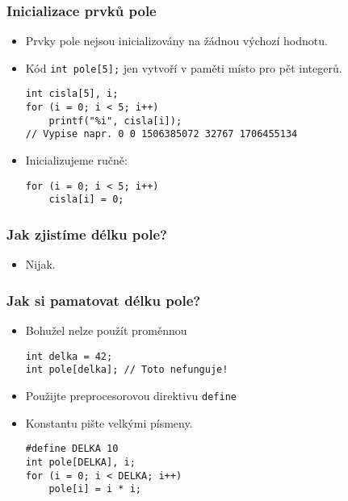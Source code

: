 \documentclass{beamer}
\newenvironment{itemizex}%
  {\large \begin{itemize}%
    \setlength{\itemsep}{8pt}%
    \setlength{\parskip}{8pt}}%
  {\end{itemize}}
\begin{document}
\begin{frame}[t,fragile]\frametitle{Inicializace prvků pole} 
  \begin{itemizex}
    \item Prvky pole nejsou inicializovány na žádnou výchozí hodnotu.
    \item Kód \texttt{int pole[5];} jen vytvoří v paměti místo pro pět integerů.
    \begin{verbatim} 
int cisla[5], i;
for (i = 0; i < 5; i++) 
    printf("%i", cisla[i]);
// Vypise napr. 0 0 1506385072 32767 1706455134
    \end{verbatim}
    \item Inicializujeme ručně:
    \begin{verbatim} 
for (i = 0; i < 5; i++) 
    cisla[i] = 0;
    \end{verbatim}
  \end{itemizex}
\end{frame}


\begin{frame}[t,fragile]\frametitle{Jak zjistíme délku pole?} 
    \begin{itemizex}
        \item Nijak.
    \end{itemizex}
\end{frame}


\begin{frame}[t,fragile]\frametitle{Jak si pamatovat délku pole?} 
    \begin{itemizex}
        \item Bohužel nelze použít proměnnou
        \begin{verbatim} 
int delka = 42;
int pole[delka]; // Toto nefunguje!
        \end{verbatim}
        \item Použijte preprocesorovou direktivu \texttt{define}
        \item Konstantu pište velkými písmeny.
        \begin{verbatim} 
#define DELKA 10
int pole[DELKA], i;
for (i = 0; i < DELKA; i++) 
    pole[i] = i * i;
        \end{verbatim}
    \end{itemizex}
\end{frame}
\end{document}
